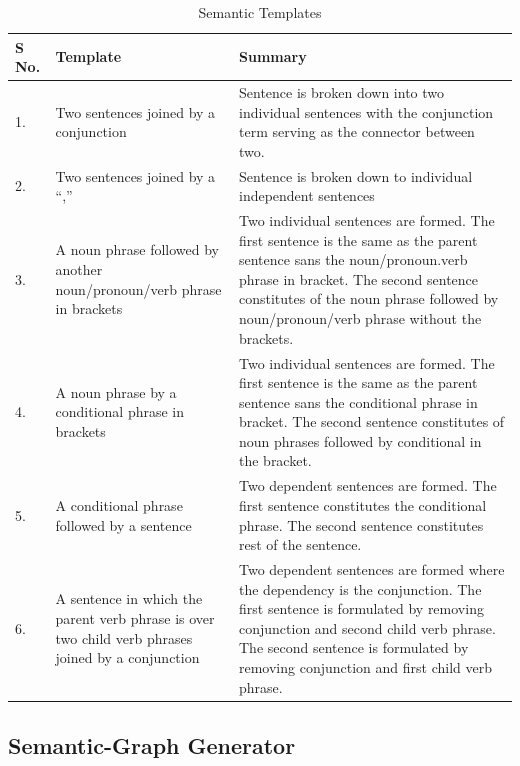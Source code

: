 \begin{table}
\begin{center}

\caption{Semantic Templates}
    \begin{tabular}{ | l | p{5cm} |p{10cm} |}
    \hline
    \textbf{S No.} 	& \textbf{Template} & \textbf{Summary} \\ \hline
    
    1. 		& Two sentences joined by a conjunction & Sentence is broken down into two individual sentences with the conjunction term serving as the connector between two. \\ \hline
    2. 		& Two sentences joined by a ``,''& Sentence is broken down to individual independent sentences \\ \hline
    3.		& A noun phrase followed by another noun/pronoun/verb phrase in brackets & Two individual sentences are formed. The first sentence is  the same as the parent sentence sans the noun/pronoun.verb phrase in bracket. The second sentence constitutes of the noun phrase followed by  noun/pronoun/verb phrase without the brackets.\\ \hline
    4.		& A noun phrase by a conditional phrase in brackets & Two individual sentences are formed. The first sentence is the same as the parent sentence sans the conditional phrase in bracket. The second sentence constitutes of noun phrases followed by conditional in the bracket.\\ \hline
    5.		& A conditional phrase followed by a sentence & Two dependent sentences are formed. The first sentence constitutes the conditional phrase. The second sentence constitutes rest of the sentence.\\ \hline
    6.		& A sentence in which the parent verb phrase is over two child verb phrases joined by a conjunction & Two dependent sentences are formed where the dependency is the conjunction. The first sentence is formulated by removing conjunction and second child verb phrase. The second sentence is formulated by removing conjunction and first child verb phrase. \\ \hline
    \end{tabular}
	\label{tab:semanticTemplates}
\end{center}
\end{table}


\subsection{Semantic-Graph Generator}
\label{sub:ACA}

